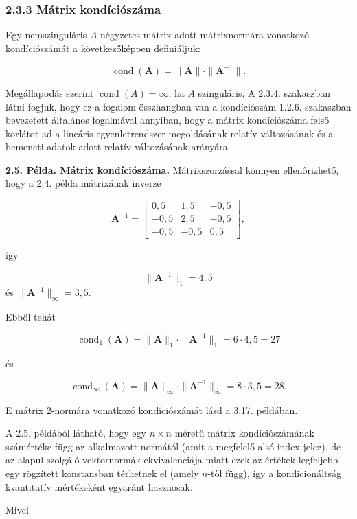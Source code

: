 \documentclass[
  magyar,
  11pt]{article}
\providecommand{\boldsymbol}[1]{\mathbf{#1}}
\begin{document}
\subsubsection{2.3.3 Mátrix
kondíciószáma}\label{muxe1trix-konduxedciuxf3szuxe1ma}

Egy nemszinguláris \(A\) négyzetes mátrix adott mátrixnormára vonatkozó
kondíciószámát a következőképpen definiáljuk:

\[\operatorname{cond}(\boldsymbol{A}) = \|\boldsymbol{A}\| \cdot \|\boldsymbol{A}^{-1}\|.\]

Megállapodás szerint \(\operatorname{cond}(A) = \infty\), ha \(A\)
szinguláris. A 2.3.4. szakaszban látni fogjuk, hogy ez a fogalom
összhangban van a kondíciószám 1.2.6. szakaszban bevezetett általános
fogalmával annyiban, hogy a mátrix kondíciószáma felső korlátot ad a
lineáris egyenletrendszer megoldásának relatív változásának és a
bemeneti adatok adott relatív változásának arányára.

\textbf{2.5. Példa. Mátrix kondíciószáma.} Mátrixszorzással könnyen
ellenőrizhető, hogy a 2.4. példa mátrixának inverze

\[\mathbf{A}^{-1} = \begin{bmatrix} 0{,}5 & 1{,}5 & -0{,}5 \\ -0{,}5 & 2{,}5 & -0{,}5 \\ -0{,}5 & -0{,}5 & 0{,}5 \end{bmatrix},\]

így

\[\|\mathbf{A}^{-1}\|_1 = 4{,}5\] és
\(\|\mathbf{A}^{-1}\|_{\infty} = 3{,}5\).

Ebből tehát

\[\operatorname{cond}_1(\mathbf{A}) = \|\mathbf{A}\|_1 \cdot \|\mathbf{A}^{-1}\|_1 = 6 \cdot 4{,}5 = 27\]

és

\[\operatorname{cond}_{\infty}(\mathbf{A}) = \|\mathbf{A}\|_{\infty} \cdot \|\mathbf{A}^{-1}\|_{\infty} = 8 \cdot 3{,}5 = 28.\]

E mátrix 2-normára vonatkozó kondíciószámát lásd a 3.17. példában.

A 2.5. példából látható, hogy egy \(n \times n\) méretű mátrix
kondíciószámának számértéke függ az alkalmazott normától (amit a
megfelelő alsó index jelez), de az alapul szolgáló vektornormák
ekvivalenciája miatt ezek az értékek legfeljebb egy rögzített
konstansban térhetnek el (amely \(n\)-től függ), így a kondicionáltság
kvantitatív mértékeként egyaránt hasznosak.

Mivel
\end{document}
